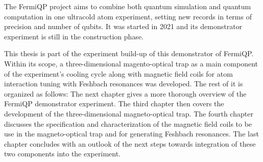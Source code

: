 The FermiQP project aims to combine both quantum simulation and quantum computation in one ultracold atom experiment, setting new records in terms of precision and number of qubits. It was started in 2021 and its demonstrator experiment is still in the construction phase.

This thesis is part of the experiment build-up of this demonstrator of FermiQP. Within its scope, a three-dimensional magento-optical trap as a main component of the experiment's cooling cycle along with magnetic field coils for atom interaction tuning with Feshbach resonances was developed. The rest of it is organized as follows: The next chapter gives a more thorough overview of the FermiQP demonstrator experiment. The third chapter then covers the development of the three-dimensional magneto-optical trap. The fourth chapter discusses the specification and characterization of the magnetic field coils to be use in the magneto-optical trap and for generating Feshbach resonances. The last chapter concludes with an outlook of the next steps towards integration of these two components into the experiment.


